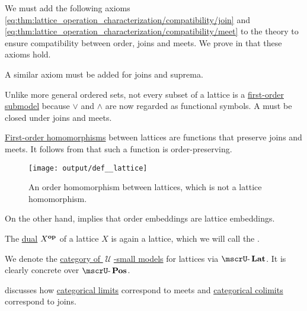 \begin{definition}
\begin{thmenum}[resume=def:lattice]
    We must add the following axioms \eqref{eq:thm:lattice_operation_characterization/compatibility/join} and \eqref{eq:thm:lattice_operation_characterization/compatibility/meet} to the theory to ensure compatibility between order, joins and meets. We prove in  that these axioms hold.

    A similar axiom must be added for joins and suprema.

     Unlike more general ordered sets, not every subset of a lattice is a \hyperref[def:first_order_submodel]{first-order submodel} because \( \vee \) and \( \wedge \) are now regarded as functional symbols. A  must be closed under joins and meets.

     \hyperref[def:first_order_homomorphism]{First-order homomorphisms} between lattices are functions that preserve joins and meets. It follows from  that such a function is order-preserving.

    \begin{figure}[!ht]
      \centering
      \texttt{[image: output/def\_\_lattice]}
      \caption{An order homomorphism between lattices, which is not a lattice homomorphism.}
      \label{fig:def:lattice/homomorphism/order_homomorphism_not_lattice_homomorrphism}
    \end{figure}

    On the other hand,  implies that order embeddings are lattice embeddings.

     The \hyperref[def:preordered_set/opposite]{dual} \( X^\oppos \) of a lattice \( X \) is again a lattice, which we will call the .

     We denote the \hyperref[def:category_of_small_first_order_models]{category of \( \mscrU \)-small models} for lattices via \( \ucat{Lat} \). It is clearly concrete over \hyperref[def:partially_ordered_set]{\( \ucat{Pos} \)}.

     discusses how \hyperref[def:category_of_cones/limit]{categorical limits} correspond to meets and \hyperref[def:category_of_cones/colimit]{categorical colimits} correspond to joins.
  \end{thmenum}
\end{definition}

